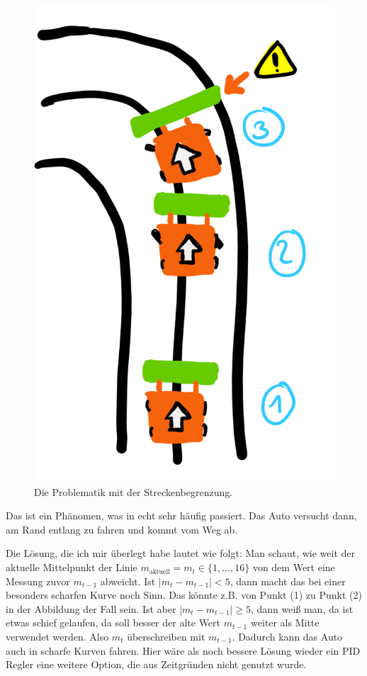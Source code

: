 	\begin{figure}[H]
		\centering
		\label{auto2}
		\includegraphics[scale=0.5]{img/Sensor/Auto2.png}
		\caption{Die Problematik mit der Streckenbegrenzung.}
	\end{figure}

	
	Das ist ein Phänomen, was in echt sehr häufig passiert. Das Auto versucht dann, am Rand entlang zu fahren und kommt vom Weg ab. 
	
	Die Lösung, die ich mir überlegt habe lautet wie folgt: Man schaut, wie weit der aktuelle Mittelpunkt der Linie $m_{\text{aktuell}} = m_t\in\{1,...,16\}$ von dem Wert eine Messung zuvor $m_{t-1}$ abweicht. Ist $|m_t - m_{t-1}| < 5$, dann macht das bei einer besonders scharfen Kurve noch Sinn. Das könnte z.B. von Punkt (1) zu Punkt (2) in der Abbildung der Fall sein. Ist aber $|m_t - m_{t-1}| \geq 5$, dann weiß man, da ist etwas schief gelaufen, da soll besser der alte Wert $m_{t-1}$ weiter als Mitte verwendet werden. Also $m_{t}$ überschreiben mit $m_{t-1}$. Dadurch kann das Auto auch in scharfe Kurven fahren. Hier wäre als noch bessere Lösung wieder ein PID Regler eine weitere Option, die aus Zeitgründen nicht genutzt wurde.
	
